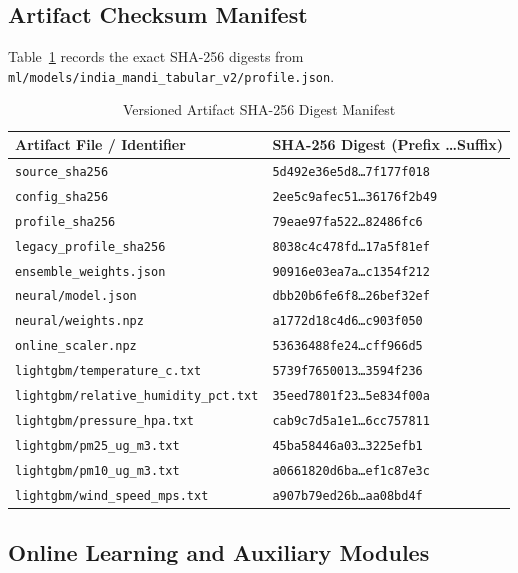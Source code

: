 \documentclass[journal,a4paper]{IEEEtran}
\begin{document}
\subsection{Artifact Checksum Manifest}

Table~\ref{tab:checksums} records the exact SHA-256 digests from \nolinkurl{ml/models/india_mandi_tabular_v2/profile.json}.

\begin{table}[!htbp]
\caption{Versioned Artifact SHA-256 Digest Manifest}
\label{tab:checksums}
\centering
\footnotesize
\begin{tabular}{@{}ll@{}}
\toprule
Artifact File / Identifier & SHA-256 Digest (Prefix \ldots Suffix) \\
\midrule
\texttt{source\_sha256} & \texttt{5d492e36e5d8\ldots 7f177f018} \\
\texttt{config\_sha256} & \texttt{2ee5c9afec51\ldots 36176f2b49} \\
\texttt{profile\_sha256} & \texttt{79eae97fa522\ldots 82486fc6} \\
\texttt{legacy\_profile\_sha256} & \texttt{8038c4c478fd\ldots 17a5f81ef} \\
\texttt{ensemble\_weights.json} & \texttt{90916e03ea7a\ldots c1354f212} \\
\texttt{neural/model.json} & \texttt{dbb20b6fe6f8\ldots 26bef32ef} \\
\texttt{neural/weights.npz} & \texttt{a1772d18c4d6\ldots c903f050} \\
\texttt{online\_scaler.npz} & \texttt{53636488fe24\ldots cff966d5} \\
\texttt{lightgbm/temperature\_c.txt} & \texttt{5739f7650013\ldots 3594f236} \\
\texttt{lightgbm/relative\_humidity\_pct.txt} & \texttt{35eed7801f23\ldots 5e834f00a} \\
\texttt{lightgbm/pressure\_hpa.txt} & \texttt{cab9c7d5a1e1\ldots 6cc757811} \\
\texttt{lightgbm/pm25\_ug\_m3.txt} & \texttt{45ba58446a03\ldots 3225efb1} \\
\texttt{lightgbm/pm10\_ug\_m3.txt} & \texttt{a0661820d6ba\ldots ef1c87e3c} \\
\texttt{lightgbm/wind\_speed\_mps.txt} & \texttt{a907b79ed26b\ldots aa08bd4f} \\
\bottomrule
\end{tabular}
\end{table}

\subsection{Online Learning and Auxiliary Modules}
\end{document}
